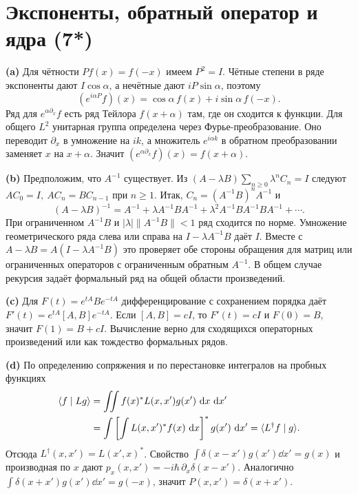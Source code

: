 \documentclass[11pt,a4paper]{article}
\begin{document}
\section{Экспоненты, обратный оператор и ядра (7*)}

\textbf{(a)} Для чётности \(P f(x)=f(-x)\) имеем \(P^2=I\).
Чётные степени в ряде экспоненты дают \(I\cos\alpha\), а нечётные
дают \(i P\sin\alpha\), поэтому
\[
 (e^{i\alpha P}f)(x)=\cos\alpha\,f(x)+i\sin\alpha\,f(-x).
\]
Ряд для \(e^{\alpha\partial_x}f\) есть ряд Тейлора \(f(x+\alpha)\)
там, где он сходится к функции. Для общего \(L^2\) унитарная группа
определена через Фурье-преобразование. Оно переводит \(\partial_x\)
в умножение на \(ik\), а множитель \(e^{i\alpha k}\) в обратном
преобразовании заменяет \(x\) на \(x+\alpha\). Значит
\((e^{\alpha\partial_x}f)(x)=f(x+\alpha)\).

\textbf{(b)} Предположим, что \(A^{-1}\) существует. Из
\((A-\lambda B)\sum_{n\ge0}\lambda^n C_n=I\) следуют
\(AC_0=I,\ AC_n=BC_{n-1}\) при \(n\ge1\).
Итак, \(C_n=(A^{-1}B)^n A^{-1}\) и
\[
 (A-\lambda B)^{-1}
 =A^{-1}+\lambda A^{-1}BA^{-1}
      +\lambda^2 A^{-1}BA^{-1}BA^{-1}+\cdots .
\]
При ограниченном \(A^{-1}B\) и \(|\lambda|\|A^{-1}B\|<1\)
ряд сходится по норме. Умножение геометрического ряда слева или
справа на \(I-\lambda A^{-1}B\) даёт \(I\). Вместе с
\(A-\lambda B=A(I-\lambda A^{-1}B)\) это проверяет обе стороны
обращения для матриц или ограниченных операторов с ограниченным
обратным \(A^{-1}\). В общем случае рекурсия задаёт формальный ряд
на общей области произведений.

\textbf{(c)} Для \(F(t)=e^{tA}Be^{-tA}\) дифференцирование с
сохранением порядка даёт \(F'(t)=e^{tA}[A,B]e^{-tA}\).
Если \([A,B]=cI\), то \(F'(t)=cI\) и \(F(0)=B\), значит
\(F(1)=B+cI\). Вычисление верно для сходящихся операторных
произведений или как тождество формальных рядов.

\textbf{(d)} По определению сопряжения и по перестановке
интегралов на пробных функциях
\begin{align*}
 \langle f\mid Lg\rangle
  &=\iint f(x)^* L(x,x')g(x')\,\mathop{}\!\mathrm{d} x\,\mathop{}\!\mathrm{d} x'\\
  &=\int \left[\int L(x,x')^* f(x)\,\mathop{}\!\mathrm{d} x\right]^*g(x')\,\mathop{}\!\mathrm{d} x'
    =\langle L^\dagger f\mid g\rangle.
\end{align*}
Отсюда \(L^\dagger(x,x')=L(x',x)^*\).
Свойство \(\int\delta(x-x')g(x')\dd x'=g(x)\) и производная по
\(x\) дают \(p_x(x,x')=-i\hbar\,\partial_x\delta(x-x')\).
Аналогично \(\int\delta(x+x')g(x')\dd x'=g(-x)\), значит
\(P(x,x')=\delta(x+x')\).
\end{document}
